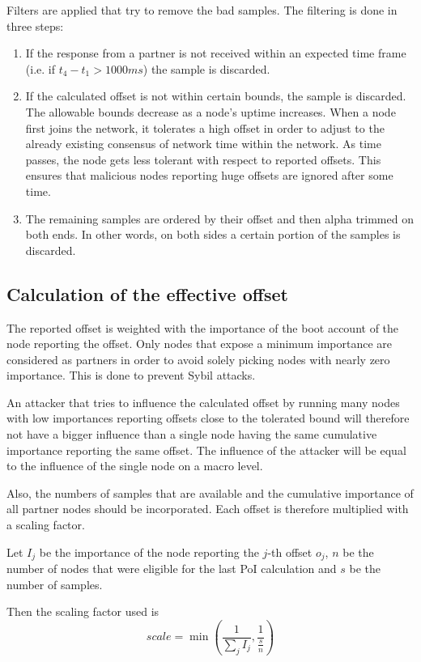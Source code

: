 Filters are applied that try to remove the bad samples. The filtering is done in three steps:
\begin{enumerate}
\item If the response from a partner is not received within an expected time frame (i.e. if $t_4-t_1 > 1000ms$) the sample is discarded.
\item If the calculated offset is not within certain bounds, the sample is discarded.
The allowable bounds decrease as a node's uptime increases.
When a node first joins the network, it tolerates a high offset in order to adjust to the already existing consensus of network time within the network.
As time passes, the node gets less tolerant with respect to reported offsets.
This ensures that malicious nodes reporting huge offsets are ignored after some time.
\item The remaining samples are ordered by their offset and then alpha trimmed on both ends.
In other words, on both sides a certain portion of the samples is discarded.
\end{enumerate}

\subsection{Calculation of the effective offset}

The reported offset is weighted with the importance of the boot account of the node reporting the offset.
Only nodes that expose a minimum importance are considered as partners in order to avoid solely picking nodes with nearly zero importance.
This is done to prevent Sybil attacks.

An attacker that tries to influence the calculated offset by running many nodes with low importances reporting offsets close to the tolerated bound will therefore not have a bigger influence than a single node having the same cumulative importance reporting the same offset.
The influence of the attacker will be equal to the influence of the single node on a macro level.

Also, the numbers of samples that are available and the cumulative importance of all partner nodes should be incorporated.
Each offset is therefore multiplied with a scaling factor.

Let $I_j$ be the importance of the node reporting the $j$-th offset $o_j$,
$\textit{n}$ be the number of nodes that were eligible for the last PoI calculation and $\textit{s}$ be the number of samples.

Then the scaling factor used is
$$ \mathit{scale} = \min\left(\frac{1}{\sum_j I_j}, \frac{1}{\frac{s}{n}}\right)$$

